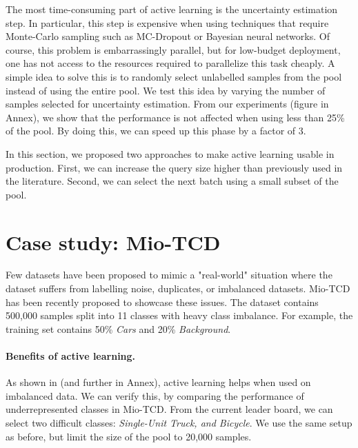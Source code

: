 \documentclass{article}
\newcommand{\figref}[1]{\hyperref[#1]{Fig.\ \ref*{#1}}}
\begin{document}
The most time-consuming part of active learning is the uncertainty estimation step. In particular, this step is expensive when using techniques that require Monte-Carlo sampling such as MC-Dropout or Bayesian neural networks. 
Of course, this problem is embarrassingly parallel, but for low-budget deployment, one has not access to the resources required to parallelize this task cheaply.
A simple idea to solve this is to randomly select unlabelled samples from the pool instead of using the entire pool. We test this idea by varying the number of samples selected for uncertainty estimation. 
From our experiments (figure in Annex), we show that the performance is not affected when using less than 25\% of the pool. By doing this, we can speed up this phase by a factor of 3.

In this section, we proposed two approaches to make active learning usable in production. First, we can increase the query size higher than previously used in the literature. Second, we can select the next batch using a small subset of the pool.


\section{Case study: Mio-TCD}

Few datasets have been proposed to mimic a "real-world" situation where the dataset suffers from labelling noise, duplicates, or imbalanced datasets. Mio-TCD \citep{luo2018mio} has been recently proposed to showcase these issues. The dataset contains 500,000 samples split into 11 classes with heavy class imbalance. For example, the training set contains 50\% \textit{Cars} and 20\% \textit{Background}. 

\paragraph{Benefits of active learning.}
As shown in \citet{gal2017deep} (and further in Annex), active learning helps when used on imbalanced data. We can verify this, by comparing the performance of underrepresented classes in Mio-TCD. From the current leader board, we can select two difficult classes: \textit{Single-Unit Truck, and Bicycle}. We use the same setup as before, but limit the size of the pool to 20,000 samples. %
\end{document}
